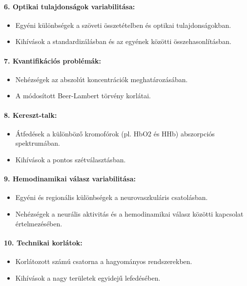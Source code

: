 \documentclass[a4paper,12pt]{article}
\begin{document}
\paragraph{6. Optikai tulajdonságok variabilitása:} \begin{itemize} \item Egyéni különbségek a szöveti összetételben és optikai tulajdonságokban. \item Kihívások a standardizálásban és az egyének közötti összehasonlításban. \end{itemize}

\paragraph{7. Kvantifikációs problémák:} \begin{itemize} \item Nehézségek az abszolút koncentrációk meghatározásában. \item A módosított Beer-Lambert törvény korlátai. \end{itemize}

\paragraph{8. Kereszt-talk:} \begin{itemize} \item Átfedések a különböző kromofórok (pl. HbO2 és HHb) abszorpciós spektrumában. \item Kihívások a pontos szétválasztásban. \end{itemize}

\paragraph{9. Hemodinamikai válasz variabilitása:} \begin{itemize} \item Egyéni és regionális különbségek a neurovaszkuláris csatolásban. \item Nehézségek a neurális aktivitás és a hemodinamikai válasz közötti kapcsolat értelmezésében. \end{itemize}

\paragraph{10. Technikai korlátok:} \begin{itemize} \item Korlátozott számú csatorna a hagyományos rendszerekben. \item Kihívások a nagy területek egyidejű lefedésében. \end{itemize}
\end{document}
